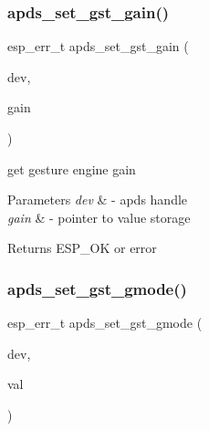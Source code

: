 \subsubsection{\texorpdfstring{apds\+\_\+set\+\_\+gst\+\_\+gain()}{apds\_set\_gst\_gain()}}
{\footnotesize\ttfamily esp\+\_\+err\+\_\+t apds\+\_\+set\+\_\+gst\+\_\+gain (\begin{DoxyParamCaption}\item[{\hyperlink{structAPDS9960__Driver}{A\+P\+D\+S\+\_\+\+D\+EV}}]{dev,  }\item[{\hyperlink{vl53l0x__types_8h_aba7bc1797add20fe3efdf37ced1182c5}{uint8\+\_\+t} $\ast$}]{gain }\end{DoxyParamCaption})}




\begin{DoxyItemize}
\item get gesture engine gain 
\end{DoxyItemize}


\begin{DoxyParams}{Parameters}
{\em dev} & -\/ apds handle \\
\hline
{\em gain} & -\/ pointer to value storage \\
\hline
\end{DoxyParams}
\begin{DoxyReturn}{Returns}
E\+S\+P\+\_\+\+OK or error 
\end{DoxyReturn}
\mbox{\label{group__APDS9960__GestureFunctions_gab60c4efecc5980d5aee3671407e79f98}} 
\subsubsection{\texorpdfstring{apds\+\_\+set\+\_\+gst\+\_\+gmode()}{apds\_set\_gst\_gmode()}}
{\footnotesize\ttfamily esp\+\_\+err\+\_\+t apds\+\_\+set\+\_\+gst\+\_\+gmode (\begin{DoxyParamCaption}\item[{\hyperlink{structAPDS9960__Driver}{A\+P\+D\+S\+\_\+\+D\+EV}}]{dev,  }\item[{\hyperlink{vl53l0x__types_8h_aba7bc1797add20fe3efdf37ced1182c5}{uint8\+\_\+t} $\ast$}]{val }\end{DoxyParamCaption})}




